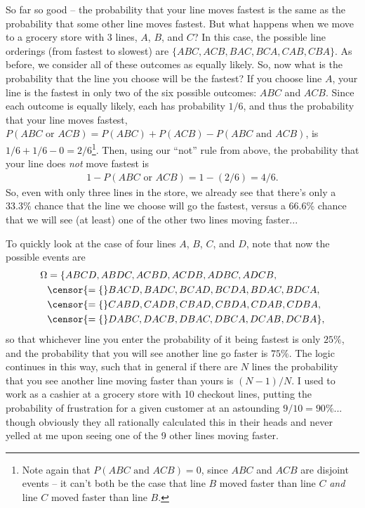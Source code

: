 So far so good -- the probability that your line moves fastest is the same as the probability that some other line moves fastest. But what happens when we move to a grocery store with 3 lines, $A$, $B$, and $C$? In this case, the possible line orderings (from fastest to slowest) are $\{ABC, ACB, BAC, BCA, CAB, CBA\}$. As before, we consider all of these outcomes as equally likely. So, now what is the probability that the line you choose will be the fastest? If you choose line $A$, your line is the fastest in only two of the six possible outcomes: $ABC$ and $ACB$. Since each outcome is equally likely, each has probability $1/6$, and thus the probability that your line moves fastest, $P(ABC\text{ or }ACB) = P(ABC)+P(ACB)-P(ABC\text{ and }ACB)$, is $1/6+1/6-0 = 2/6$\footnote{Note again that $P(ABC\text{ and }ACB) = 0$, since $ABC$ and $ACB$ are disjoint events -- it can't both be the case that line $B$ moved faster than line $C$ \textit{and} line $C$ moved faster than line $B$.}. Then, using our ``not'' rule from above, the probability that your line does \textit{not} move fastest is
\begin{align*}
1 - P(ABC\text{ or }ACB) = 1 - (2/6) = 4/6.
\end{align*}
So, even with only three lines in the store, we already see that there's only a 33.3\% chance that the line we choose will go the fastest, versus a 66.6\% chance that we will see (at least) one of the other two lines moving faster...

To quickly look at the case of four lines $A$, $B$, $C$, and $D$, note that now the possible events are
\begin{align*}
\Omega &= \{ABCD, ABDC, ACBD, ACDB, ADBC, ADCB, \\
&\censor{= \{}BACD, BADC, BCAD, BCDA, BDAC, BDCA, \\
&\censor{= \{}CABD, CADB, CBAD, CBDA, CDAB, CDBA, \\
&\censor{= \{}DABC, DACB, DBAC, DBCA, DCAB, DCBA\},
\end{align*}
so that whichever line you enter the probability of it being fastest is only $25\%$, and the probability that you will see another line go faster is $75\%$. The logic continues in this way, such that in general if there are $N$ lines the probability that you see another line moving faster than yours is $(N-1)/N$. I used to work as a cashier at a grocery store with 10 checkout lines, putting the probability of frustration for a given customer at an astounding $9/10 = 90\%$... though obviously they all rationally calculated this in their heads and never yelled at me upon seeing one of the 9 other lines moving faster.

